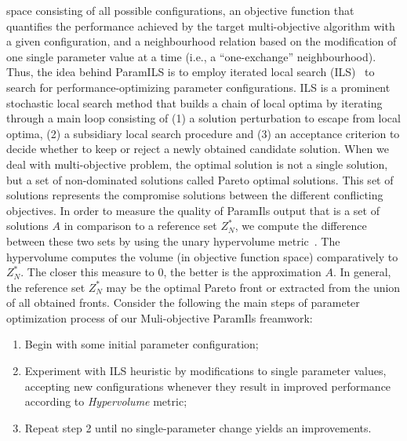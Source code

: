 \documentclass[a4paper,10pt]{article}
\begin{document}
space consisting of all possible configurations, an objective function that quantifies the performance achieved by the target multi-objective algorithm with a given configuration, and a neighbourhood relation based on
the modification of one single parameter value at a time (i.e., a “one-exchange” neighbourhood).\\
Thus, the idea behind ParamILS is to  employ iterated local search (ILS)~\cite{lourencco2003iterated} to search for performance-optimizing parameter configurations. ILS is a prominent stochastic
local search method that builds a chain of local optima by iterating through a main loop consisting of (1) a solution perturbation to escape from local optima, (2) a subsidiary local search procedure and
(3) an acceptance criterion to decide whether to keep or reject a newly obtained candidate solution.
When we deal with multi-objective problem, the optimal solution is not a single solution, but a set of non-dominated solutions called Pareto optimal solutions.
This set of solutions represents the compromise solutions between the different conflicting objectives. 
In order to measure the quality of ParamIls output that is a set of solutions $A$ in comparison to a reference set $Z^*_N$, we compute the difference between these two sets by using the unary hypervolume
metric~\cite{Zitzler2004}. The hypervolume computes the volume (in objective function space) comparatively to $Z^*_N$. The closer this measure to 0, the better is the approximation $A$.
In general, the reference set $Z^*_N$ may be the optimal Pareto front or extracted from the union of all obtained fronts.  
Consider the following  the main steps of parameter optimization process of our Muli-objective ParamIls freamwork:
\begin{enumerate}
 \item  Begin with some initial parameter configuration;
 \item Experiment with ILS heuristic by modifications to single parameter values, accepting new configurations whenever
they result in improved performance according to \textit{Hypervolume} metric;
\item Repeat step 2 until no single-parameter change yields an improvements.
\end{enumerate}


 

\end{document}
